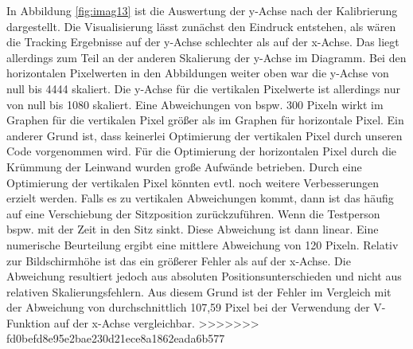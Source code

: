 In Abbildung \ref{fig:imag13} ist die Auswertung der y-Achse nach der Kalibrierung dargestellt. Die Visualisierung lässt zunächst den Eindruck entstehen, als wären die Tracking Ergebnisse auf der y-Achse schlechter als auf der x-Achse. Das liegt allerdings zum Teil an der anderen Skalierung der y-Achse im Diagramm. Bei den horizontalen Pixelwerten in den Abbildungen weiter oben war die y-Achse von null bis 4444 skaliert. Die y-Achse für die vertikalen Pixelwerte ist allerdings nur von null bis 1080 skaliert. Eine Abweichungen von bspw. 300 Pixeln wirkt im Graphen für die vertikalen Pixel größer als im Graphen für horizontale Pixel. Ein anderer Grund ist, dass keinerlei Optimierung der vertikalen Pixel durch unseren Code vorgenommen wird. Für die Optimierung der horizontalen Pixel durch die Krümmung der Leinwand wurden große Aufwände betrieben. Durch eine Optimierung der vertikalen Pixel könnten evtl. noch weitere Verbesserungen erzielt werden. Falls es zu vertikalen Abweichungen kommt, dann ist das häufig auf eine Verschiebung der Sitzposition zurückzuführen. Wenn die Testperson bspw. mit der Zeit in den Sitz sinkt. Diese Abweichung ist dann linear. Eine numerische Beurteilung ergibt eine mittlere Abweichung von 120 Pixeln. Relativ zur Bildschirmhöhe ist das ein größerer Fehler als auf der x-Achse. Die Abweichung resultiert jedoch aus absoluten Positionsunterschieden und nicht aus relativen Skalierungsfehlern. Aus diesem Grund ist der Fehler im Vergleich mit der Abweichung von durchschnittlich 107,59 Pixel bei der Verwendung der V-Funktion auf der x-Achse vergleichbar. 
>>>>>>> fd0befd8e95e2bae230d21ece8a1862eada6b577


